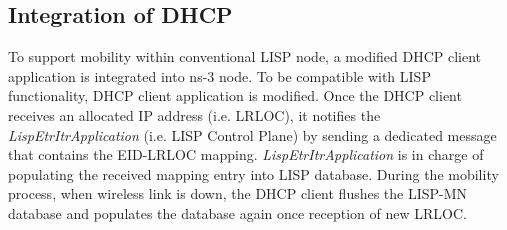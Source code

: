 \subsection{Integration of DHCP}
\label{subsec:DHCP}
To support mobility within conventional LISP node, a modified DHCP client application is integrated into ns-3 node. To be compatible with LISP functionality, DHCP client application is modified. Once the DHCP client receives an allocated IP address (i.e. LRLOC), it notifies the \emph{LispEtrItrApplication} (i.e. LISP Control Plane) by sending a dedicated message that contains the EID-LRLOC mapping. \emph{LispEtrItrApplication} is in charge of populating the received mapping entry into LISP database. During the mobility process, when wireless link is down, the DHCP client flushes the LISP-MN database and populates the database again once reception of new LRLOC. 



